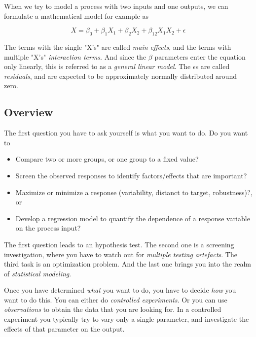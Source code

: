 When we try to model a process with two inputs and one outputs, we can
formulate a mathematical model for example as

\begin{equation}
    X = \beta_0 + \beta_1 X_1 + \beta_2 X_2 + \beta_{12} X_1 X_2 + \epsilon
\end{equation}

The terms with the single "X's" are called \emph{main effects}, and the terms with multiple "X's" \emph{interaction terms}. And since the $\beta$
parameters enter the equation only linearly, this is referred to as a \emph{general linear model}. The $\epsilon$s are called \emph{residuals}, and
are expected to be approximately normally distributed around zero.

\subsection{Overview}

The first question you have to ask yourself is what you want to do. Do you want to

\begin{itemize}
    \item{Compare two or more groups, or one group to a fixed value?}
    \item{Screen the observed responses to identify
            factors/effects that are important?}
    \item{Maximize or minimize a response (variability, distanct to target,
            robustness)?, or}
    \item{Develop a regression model to quantify the dependence of a
            response variable on the process input?}
\end{itemize}

The first question leads to an hypothesis test. The second one is a screening investigation, where you have to watch out for \emph{multiple testing artefacts}. The third task is an optimization problem. And the last one brings you into the realm of \emph{statistical modeling}.

Once you have determined \emph{what} you want to do, you have to decide \emph{how} you want to do this. You can either do \emph{controlled experiments}. Or you can use \emph{observations} to obtain the data that you are looking for. In a controlled experiment you typically try to vary only a single parameter, and investigate the effects of that parameter on the output.

